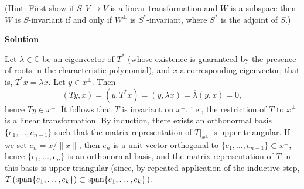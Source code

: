 \documentclass{article}
\def\span{\mathop{\rm span}\nolimits}
\begin{document}
\begin{enumerate}
(Hint:  First show if \(S : V \to V\) is a linear transformation and \(W\) is a subspace then \(W\) is \(S\)-invariant if and only if \(W^{\perp}\) is \(S^*\)-invariant, where \(S^*\) is the adjoint of \(S\).)

{\bf Solution}

Let \(\lambda \in \mathbb{C}\) be an eigenvector of \(T^*\) (whose existence is guaranteed by the presence of roots in the characteristic polynomial), and \(x\) a corresponding eigenvector; that is, \(T^*x = \lambda x\).  Let \(y \in x^{\perp}\).  Then
\[(Ty, x) = (y, T^*x) = (y, \lambda x) = \overline{\lambda} (y, x) = 0,\]
hence \(Ty \in x^{\perp}\).  It follows that \(T\) is invariant on \(x^{\perp}\), i.e., the restriction of \(T\) to \(x^{\perp}\) is a linear transformation.  By induction, there exists an orthonormal basis \(\{e_1, \ldots, e_{n - 1}\}\) such that the matrix representation of \(T|_{x^{\perp}}\) is upper triangular.  If we set \(e_n = x / \|x\|\), then \(e_n\) is a unit vector orthogonal to \(\{e_1, \ldots, e_{n - 1}\} \subset x^{\perp}\), hence \(\{e_1, \ldots, e_n\}\) is an orthonormal basis, and the matrix representation of \(T\) in this basis is upper triangular (since, by repeated application of the inductive step, \(T \left( \span \{e_1, \ldots, e_k\} \right) \subset \span \{e_1, \ldots, e_k\}\)).



\end{enumerate}
\end{document}
